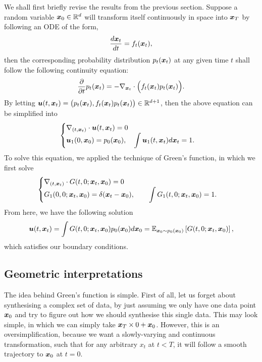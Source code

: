 We shall first briefly revise the results from the previous section. Suppose a random variable $\bm{x}_0\in\mathbb{R}^d$ will transform itself continuously in space into $\bm{x}_T$ by following an ODE of the form,
\begin{equation}
    \label{eq:15.1}
    \frac{d\bm{x}_{t}}{dt}=f_t(\bm{x}_{t}),
\end{equation}
then the corresponding probability distribution $p_t (\bm{x}_{t})$ at any given time $t$ shall follow the following continuity equation:
\begin{equation}
    \label{eq:15.2}
    \frac{\partial}{\partial t}p_t(\bm{x}_{t})=-\nabla_{\bm{x}_{t}}\cdot\Bigl(f_t(\bm{x}_{t})p_t(\bm{x}_{t})\Bigr).
\end{equation}
By letting $\bm{u}(t,\bm{x}_{t})=\bigl(p_t(\bm{x}_{t}),f_t(\bm{x}_{t})p_t(\bm{x}_{t})\bigr)\in \mathbb{R}^{d+1}$, then the above equation can be simplified into 
\begin{equation}
\label{eq:15.3}
    \begin{cases}
        \nabla_{(t,\bm{x}_{t})}\cdot\bm{u}(t,\bm{x}_{t})=0\\
        \bm{u}_1(0,\bm{x}_0)=p_0(\bm{x}_0),\quad \displaystyle{\int \bm{u}_{1}(t,\bm{x}_{t})d\bm{x}_{t}=1}.
    \end{cases}
\end{equation}
To solve this equation, we applied the technique of Green's function, in which we first solve
\begin{equation}
    \label{eq:15.4}
    \begin{cases}
        \nabla_{(t,\bm{x}_{t})}\cdot G(t,0;\bm{x}_{t},\bm{x}_0)=0\\
        G_{1}(0,0;\bm{x}_{t},\bm{x}_0)=\delta(\bm{x}_{t}-\bm{x}_0),\qquad \displaystyle{\int G_{1}(t,0;\bm{x}_{t},\bm{x}_0)=1}.
    \end{cases}
\end{equation}
From here, we have the following solution
\begin{equation}
    \bm{u}(t,\bm{x}_{t})=\int G(t,0;\bm{x}_{t},\bm{x}_0)p_0 (\bm{x}_0)d\bm{x}_0=\mathbb{E}_{\bm{x}_0\sim p_0(\bm{x}_0)}\left[G(t,0;\bm{x}_{t},\bm{x}_0)\right],
\end{equation}
which satisfies our boundary conditions.

\subsection{Geometric interpretations}
The idea behind Green's function is simple. First of all, let us forget about synthesising a complex set of data, by just assuming we only have one data point $\bm{x}_0$ and try to figure out how we should synthesise this single data. This may look simple, in which we can simply take $\bm{x}_T\times 0+\bm{x}_0$. However, this is an oversimplification, because we want a slowly-varying and continuous transformation, such that for any arbitrary $x_t$ at $t<T$, it will follow a smooth trajectory to $\bm{x}_0$ at $t=0$.

